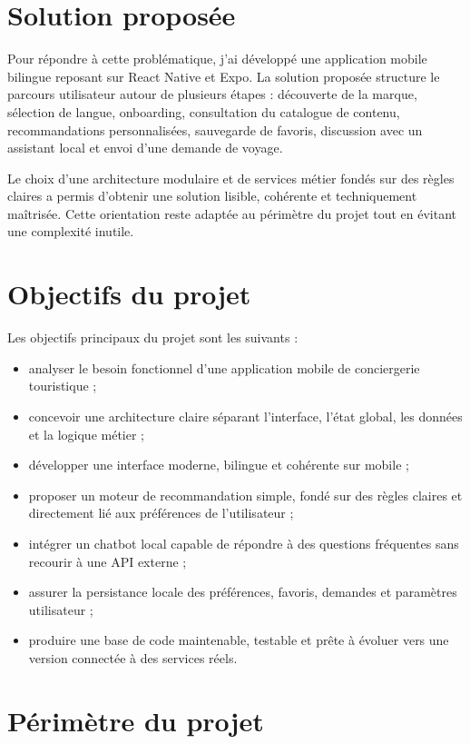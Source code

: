 \documentclass[12pt,a4paper]{report}
\begin{document}
\section{Solution proposée}

Pour répondre à cette problématique, j'ai développé une application mobile bilingue reposant sur React Native et Expo. La solution proposée structure le parcours utilisateur autour de plusieurs étapes : découverte de la marque, sélection de langue, onboarding, consultation du catalogue de contenu, recommandations personnalisées, sauvegarde de favoris, discussion avec un assistant local et envoi d'une demande de voyage.

Le choix d'une architecture modulaire et de services métier fondés sur des règles claires a permis d'obtenir une solution lisible, cohérente et techniquement maîtrisée. Cette orientation reste adaptée au périmètre du projet tout en évitant une complexité inutile.

\section{Objectifs du projet}

Les objectifs principaux du projet sont les suivants :

\begin{itemize}
\item analyser le besoin fonctionnel d'une application mobile de conciergerie touristique ;
\item concevoir une architecture claire séparant l'interface, l'état global, les données et la logique métier ;
\item développer une interface moderne, bilingue et cohérente sur mobile ;
\item proposer un moteur de recommandation simple, fondé sur des règles claires et directement lié aux préférences de l'utilisateur ;
\item intégrer un chatbot local capable de répondre à des questions fréquentes sans recourir à une API externe ;
\item assurer la persistance locale des préférences, favoris, demandes et paramètres utilisateur ;
\item produire une base de code maintenable, testable et prête à évoluer vers une version connectée à des services réels.
\end{itemize}

\section{Périmètre du projet}
\end{document}
